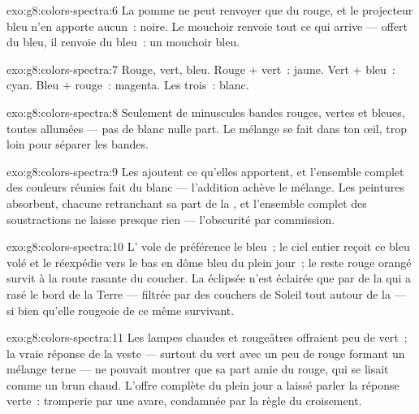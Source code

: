 \begin{solution}{exo:g8:colors-spectra:6}
La pomme ne peut renvoyer que du rouge, et le projecteur bleu n'en
apporte aucun~: noire. Le mouchoir renvoie tout ce qui arrive ---
offert du bleu, il renvoie du bleu~: un mouchoir bleu.
\end{solution}

\begin{solution}{exo:g8:colors-spectra:7}
Rouge, vert, bleu. Rouge $+$ vert~: jaune. Vert $+$ bleu~: cyan.
Bleu $+$ rouge~: magenta. Les trois~: blanc.
\end{solution}

\begin{solution}{exo:g8:colors-spectra:8}
Seulement de minuscules bandes rouges, vertes et bleues, toutes
allumées --- pas de blanc nulle part. Le mélange se fait dans ton œil,
trop loin pour séparer les bandes.
\end{solution}

\begin{solution}{exo:g8:colors-spectra:9}
Les  ajoutent ce qu'elles apportent, et l'ensemble complet des
couleurs réunies fait du blanc --- l'addition achève le mélange. Les
peintures absorbent, chacune retranchant sa part de la , et
l'ensemble complet des soustractions ne laisse presque rien ---
l'obscurité par commission.
\end{solution}

\begin{solution}{exo:g8:colors-spectra:10}
L' vole de préférence le bleu~; le ciel entier reçoit ce bleu volé
et le réexpédie vers le bas en dôme bleu du plein jour~; le reste
rouge orangé survit à la route rasante du coucher. La  éclipsée
n'est éclairée que par de la  qui a rasé le bord de la Terre
--- filtrée par des couchers de Soleil tout autour de la  ---
si bien qu'elle rougeoie de ce même survivant.
\end{solution}

\begin{solution}{exo:g8:colors-spectra:11}
Les lampes chaudes et rougeâtres offraient peu de vert~; la vraie
réponse de la veste --- surtout du vert avec un peu de rouge formant
un mélange terne --- ne pouvait montrer que sa part amie du rouge, qui
se lisait comme un brun chaud. L'offre complète du plein jour a laissé
parler la réponse verte~: tromperie par une  avare, condamnée
par la règle du croisement.
\end{solution}

